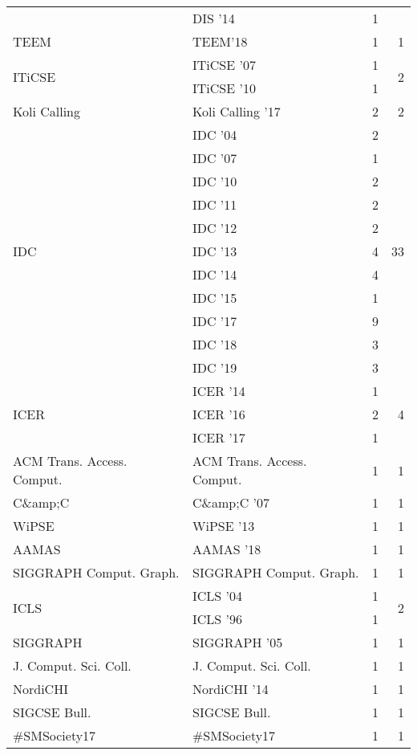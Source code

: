 \begin{table*}[t]
\begin{tabular}{llrr}
& DIS '14 & 1 &\\
\multirow{1}{*}{TEEM} & TEEM'18 & 1 & \multirow{1}{*}{1}\\
\multirow{2}{*}{ITiCSE } & ITiCSE '07 & 1 & \multirow{2}{*}{2}\\
& ITiCSE '10 & 1 &\\
\multirow{1}{*}{Koli Calling } & Koli Calling '17 & 2 & \multirow{1}{*}{2}\\
\multirow{11}{*}{IDC } & IDC '04 & 2 & \multirow{11}{*}{33}\\
& IDC '07 & 1 &\\
& IDC '10 & 2 &\\
& IDC '11 & 2 &\\
& IDC '12 & 2 &\\
& IDC '13 & 4 &\\
& IDC '14 & 4 &\\
& IDC '15 & 1 &\\
& IDC '17 & 9 &\\
& IDC '18 & 3 &\\
& IDC '19 & 3 &\\
\multirow{3}{*}{ICER } & ICER '14 & 1 & \multirow{3}{*}{4}\\
& ICER '16 & 2 &\\
& ICER '17 & 1 &\\
\multirow{1}{*}{ACM Trans. Access. Comput.} & ACM Trans. Access. Comput. & 1 & \multirow{1}{*}{1}\\
\multirow{1}{*}{C\&amp;C } & C\&amp;C '07 & 1 & \multirow{1}{*}{1}\\
\multirow{1}{*}{WiPSE } & WiPSE '13 & 1 & \multirow{1}{*}{1}\\
\multirow{1}{*}{AAMAS } & AAMAS '18 & 1 & \multirow{1}{*}{1}\\
\multirow{1}{*}{SIGGRAPH Comput. Graph.} & SIGGRAPH Comput. Graph. & 1 & \multirow{1}{*}{1}\\
\multirow{2}{*}{ICLS } & ICLS '04 & 1 & \multirow{2}{*}{2}\\
& ICLS '96 & 1 &\\
\multirow{1}{*}{SIGGRAPH } & SIGGRAPH '05 & 1 & \multirow{1}{*}{1}\\
\multirow{1}{*}{J. Comput. Sci. Coll.} & J. Comput. Sci. Coll. & 1 & \multirow{1}{*}{1}\\
\multirow{1}{*}{NordiCHI } & NordiCHI '14 & 1 & \multirow{1}{*}{1}\\
\multirow{1}{*}{SIGCSE Bull.} & SIGCSE Bull. & 1 & \multirow{1}{*}{1}\\
\multirow{1}{*}{\#SMSociety17} & \#SMSociety17 & 1 & \multirow{1}{*}{1}\\

\end{tabular}
\end{table*}

